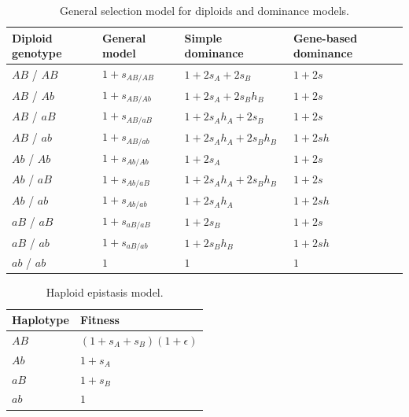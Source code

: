 \documentclass[]{article}
\begin{document}
\begin{table}[ht!]
    \centering
    \begin{tabular}{llll}
        \toprule
        Diploid genotype & General model & Simple dominance & Gene-based dominance\\
        \midrule
        $AB$ / $AB$ & $1 + s_{AB/AB}$ & $1 + 2s_A + 2s_B$ & $1 + 2s$\\
        $AB$ / $Ab$ & $1 + s_{AB/Ab}$ & $1 + 2s_A + 2s_Bh_B$ & $1 + 2s$\\
        $AB$ / $aB$ & $1 + s_{AB/aB}$ & $1 + 2s_Ah_A + 2s_B$ & $1 + 2s$\\
        $AB$ / $ab$ & $1 + s_{AB/ab}$ & $1 + 2s_Ah_A + 2s_Bh_B$ & $1 + 2sh$\\
        $Ab$ / $Ab$ & $1 + s_{Ab/Ab}$ & $1 + 2s_A$ & $1 + 2s$\\
        \addlinespace
        $Ab$ / $aB$ & $1 + s_{Ab/aB}$ & $1 + 2s_Ah_A + 2s_Bh_B$ & $1 + 2s$\\
        $Ab$ / $ab$ & $1 + s_{Ab/ab}$ & $1 + 2s_Ah_A$ & $1 + 2sh$\\
        $aB$ / $aB$ & $1 + s_{aB/aB}$ & $1 + 2s_B$ & $1 + 2s$\\
        $aB$ / $ab$ & $1 + s_{aB/ab}$ & $1 + 2s_Bh_B$ & $1 + 2sh$\\
        $ab$ / $ab$ & $1$ & $1$ & $1$\\
        \bottomrule
    \end{tabular}
    \caption{General selection model for diploids and dominance models.}
    \label{tab:selmodels}
\end{table}


\begin{table}[ht!]
    \centering
    \begin{tabular}{ll}
        \toprule
        Haplotype & Fitness\\
        \midrule
        $AB$ & $(1 + s_A + s_B)(1+\epsilon)$\\
        $Ab$ & $1 + s_A$\\
        $aB$ & $1 + s_B$\\
        $ab$ & $1$\\
        \bottomrule
    \end{tabular}
    \caption{Haploid epistasis model.}
    \label{tab:epistasis}
\end{table}
\end{document}
